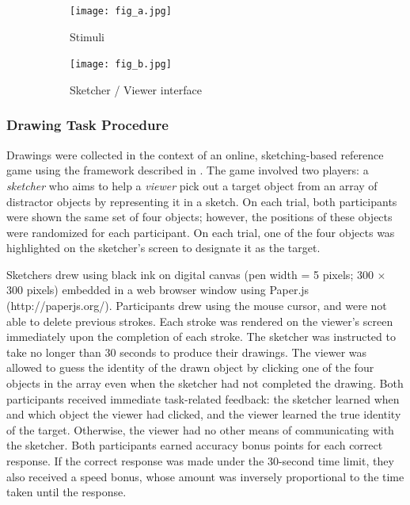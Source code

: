 \documentclass[10pt,letterpaper]{article}
\begin{document}


\begin{figure}
\begin{subfigure}{0.23\textwidth}
\texttt{[image: fig\_a.jpg]}
\caption{Stimuli} \label{fig:1a}
\end{subfigure}
\hspace*{\fill} 
\begin{subfigure}{0.23\textwidth}
\texttt{[image: fig\_b.jpg]}
\caption{Sketcher / Viewer interface} \label{fig:1b}
\end{subfigure}
\caption{} \label{fig:1}
\end{figure}


\subsubsection{Drawing Task Procedure}
Drawings were collected in the context of an online, sketching-based reference game using the framework described in . The game involved two players: a \textit{sketcher} who aims to help a \textit{viewer} pick out a target object from an array of distractor objects by representing it in a sketch. On each trial, both participants were shown the same set of four objects; however, the positions of these objects were randomized for each participant. On each trial, one of the four objects was highlighted on the sketcher's screen to designate it as the target.

Sketchers drew using black ink on digital canvas (pen width = 5 pixels; 300 $\times$ 300 pixels) embedded in a web browser window using Paper.js (http://paperjs.org/). Participants drew using the mouse cursor, and were not able to delete previous strokes. Each stroke was rendered on the viewer's screen immediately upon the completion of each stroke. The sketcher was instructed to take no longer than 30 seconds to produce their drawings. The viewer was allowed to guess the identity of the drawn object by clicking one of the four objects in the array even when the sketcher had not completed the drawing. Both participants received immediate task-related feedback: the sketcher learned when and which object the viewer had clicked, and the viewer learned the true identity of the target. Otherwise, the viewer had no other means of communicating with the sketcher. Both participants earned accuracy bonus points for each correct response. If the correct response was made under the 30-second time limit, they also received a speed bonus, whose amount was inversely proportional to the time taken until the response. 
\end{document}
